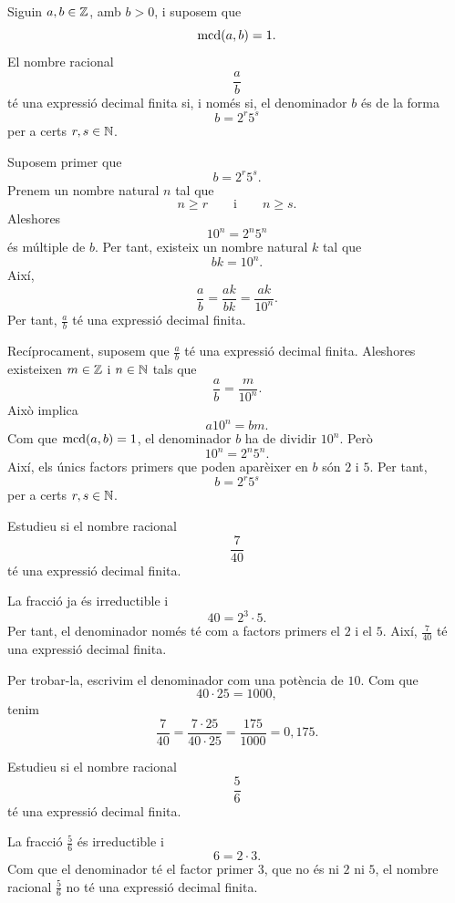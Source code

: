 \begin{proposicio}
Siguin \(a,b\in\mathbb{Z}\), amb \(b>0\), i suposem que
\[
	\operatorname{mcd}(a,b)=1.
\]
El nombre racional
\[
	\frac{a}{b}
\]
té una expressió decimal finita si, i només si, el denominador \(b\) és de la forma
\[
	b=2^r5^s
\]
per a certs \(r,s\in\mathbb{N}\).
\end{proposicio}

\begin{prova}
Suposem primer que
\[
	b=2^r5^s.
\]
Prenem un nombre natural \(n\) tal que
\[
	n\geq r
	\qquad\text{i}\qquad
	n\geq s.
\]
Aleshores
\[
	10^n=2^n5^n
\]
és múltiple de \(b\). Per tant, existeix un nombre natural \(k\) tal que
\[
	bk=10^n.
\]
Així,
\[
	\frac{a}{b}
	=
	\frac{ak}{bk}
	=
	\frac{ak}{10^n}.
\]
Per tant, \(\frac{a}{b}\) té una expressió decimal finita.

Recíprocament, suposem que \(\frac{a}{b}\) té una expressió decimal finita. Aleshores existeixen \(m\in\mathbb{Z}\) i \(n\in\mathbb{N}\) tals que
\[
	\frac{a}{b}=\frac{m}{10^n}.
\]
Això implica
\[
	a10^n=bm.
\]
Com que \(\operatorname{mcd}(a,b)=1\), el denominador \(b\) ha de dividir \(10^n\). Però
\[
	10^n=2^n5^n.
\]
Així, els únics factors primers que poden aparèixer en \(b\) són \(2\) i \(5\). Per tant,
\[
	b=2^r5^s
\]
per a certs \(r,s\in\mathbb{N}\).
\end{prova}

\begin{exemple}
Estudieu si el nombre racional
\[
	\frac{7}{40}
\]
té una expressió decimal finita.
\end{exemple}

\begin{solucio}
La fracció ja és irreductible i
\[
	40=2^3\cdot5.
\]
Per tant, el denominador només té com a factors primers el \(2\) i el \(5\). Així, \(\frac{7}{40}\) té una expressió decimal finita.

Per trobar-la, escrivim el denominador com una potència de \(10\). Com que
\[
	40\cdot25=1000,
\]
tenim
\[
	\frac{7}{40}
	=
	\frac{7\cdot25}{40\cdot25}
	=
	\frac{175}{1000}
	=
	0{,}175.
\]
\end{solucio}

\begin{exemple}
Estudieu si el nombre racional
\[
	\frac{5}{6}
\]
té una expressió decimal finita.
\end{exemple}

\begin{solucio}
La fracció \(\frac{5}{6}\) és irreductible i
\[
	6=2\cdot3.
\]
Com que el denominador té el factor primer \(3\), que no és ni \(2\) ni \(5\), el nombre racional \(\frac{5}{6}\) no té una expressió decimal finita.
\end{solucio}

